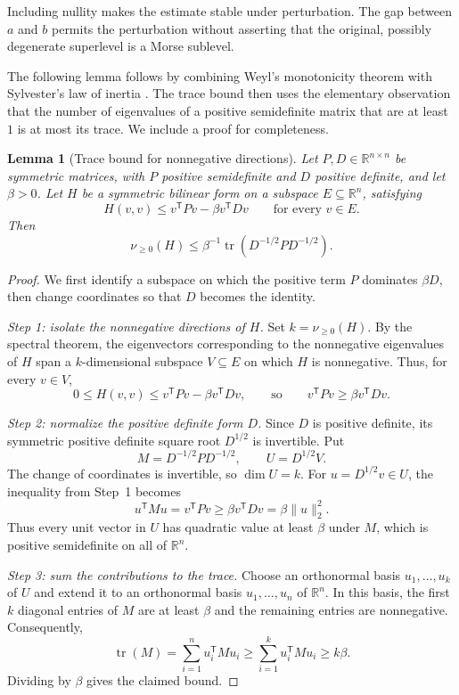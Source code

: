 \documentclass[11pt]{article}
\newtheorem{lemma}[theorem]{Lemma}
\theoremstyle{remark}
\begin{document}
Including nullity makes the estimate stable under perturbation.
The gap between $a$ and $b$ permits the perturbation without asserting
that the original, possibly degenerate superlevel is a Morse sublevel.

The following lemma follows by combining Weyl's monotonicity theorem
\cite[Corollary~4.3.3, p.~182]{HornJohnson} with Sylvester's law of inertia
\cite[Theorem~4.5.8, p.~222]{HornJohnson}.
The trace bound then uses the elementary observation that the number of
eigenvalues of a positive semidefinite matrix that are at least~$1$ is
at most its trace. We include a proof for completeness.

\begin{lemma}[Trace bound for nonnegative directions]
\label{lem:trace-bound}
Let $P,D\in\mathbb R^{n\times n}$ be symmetric matrices, with $P$
positive semidefinite and $D$ positive definite, and let $\beta>0$.
Let $H$ be a symmetric bilinear form on a subspace
$E\subseteq\mathbb R^n$, satisfying
\[
 H(v,v)\leq v^{\mathsf T}Pv-\beta v^{\mathsf T}Dv
 \qquad\text{for every }v\in E.
\]
Then
\begin{equation}\label{eq:tracelemma}
 \nu_{\geq0}(H)
 \leq \beta^{-1}\operatorname{tr}(D^{-1/2}PD^{-1/2}).
\end{equation}
\end{lemma}

\begin{proof}
We first identify a subspace on which the positive term $P$ dominates
$\beta D$, then change coordinates so that $D$ becomes the identity.

\smallskip
\noindent\emph{Step 1: isolate the nonnegative directions of $H$.}
Set $k=\nu_{\geq0}(H)$. By the spectral theorem, the eigenvectors
corresponding to the nonnegative eigenvalues of $H$ span a
$k$-dimensional subspace $V\subseteq E$ on which $H$ is nonnegative.
Thus, for every $v\in V$,
\[
 0\leq H(v,v)\leq v^{\mathsf T}Pv-\beta v^{\mathsf T}Dv,
 \qquad\text{so}\qquad
 v^{\mathsf T}Pv\geq\beta v^{\mathsf T}Dv.
\]

\smallskip
\noindent\emph{Step 2: normalize the positive definite form $D$.}
Since $D$ is positive definite, its symmetric positive definite
square root $D^{1/2}$ is invertible. Put
\[
 M=D^{-1/2}PD^{-1/2},\qquad U=D^{1/2}V.
\]
The change of coordinates is invertible, so $\dim U=k$.
For $u=D^{1/2}v\in U$, the inequality from Step~1 becomes
\[
 u^{\mathsf T}Mu
 =v^{\mathsf T}Pv
 \geq\beta v^{\mathsf T}Dv
 =\beta\|u\|_2^2.
\]
Thus every unit vector in $U$ has quadratic value at least $\beta$
under $M$, which is positive semidefinite on all of $\mathbb R^n$.

\smallskip
\noindent\emph{Step 3: sum the contributions to the trace.}
Choose an orthonormal basis $u_1,\ldots,u_k$ of $U$ and extend it
to an orthonormal basis $u_1,\ldots,u_n$ of $\mathbb R^n$.
In this basis, the first $k$ diagonal entries of $M$ are at least
$\beta$ and the remaining entries are nonnegative. Consequently,
\[
 \operatorname{tr}(M)
 =\sum_{i=1}^n u_i^{\mathsf T}Mu_i
 \geq\sum_{i=1}^k u_i^{\mathsf T}Mu_i
 \geq k\beta.
\]
Dividing by $\beta$ gives the claimed bound.
\end{proof}
\end{document}

